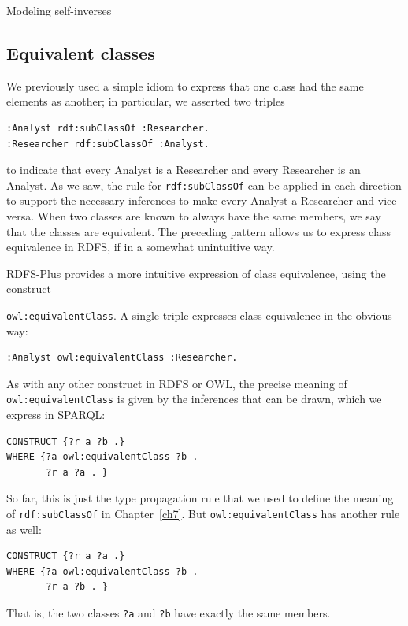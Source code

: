 \begin{challenge}{Modeling self-inverses}
\subsection{Equivalent classes}

We previously used a simple idiom to express that one class had the same
elements as another; in particular, we asserted two triples

\begin{lstlisting}
:Analyst rdf:subClassOf :Researcher.
:Researcher rdf:subClassOf :Analyst.
\end{lstlisting}

to indicate that every Analyst is a Researcher and every Researcher is
an Analyst. As we saw, the rule for \texttt{rdf:subClassOf} can be applied in
each direction to support the necessary inferences to make every Analyst
a Researcher and vice versa. When two classes are known to always have
the same members, we say that the classes are equivalent. The preceding
pattern allows us to express class equivalence in RDFS, if in a somewhat
unintuitive way.

RDFS-Plus provides a more intuitive expression of class equivalence,
using the construct

\texttt{owl:equivalentClass}. A single triple expresses class equivalence in the
obvious way:

\begin{lstlisting}
:Analyst owl:equivalentClass :Researcher.
\end{lstlisting}

As with any other construct in RDFS or OWL, the precise meaning of
\texttt{owl:equivalentClass} is given by the inferences that can be drawn, which
we express in SPARQL:

\begin{lstlisting}
CONSTRUCT {?r a ?b .}
WHERE {?a owl:equivalentClass ?b .
       ?r a ?a . }
\end{lstlisting}

So far, this is just the type propagation rule that we used to define
the meaning of \texttt{rdf:subClassOf} in Chapter~\ref{ch7}. But \texttt{owl:equivalentClass} has another rule as
well:

\begin{lstlisting}
CONSTRUCT {?r a ?a .}
WHERE {?a owl:equivalentClass ?b .
       ?r a ?b . }
\end{lstlisting}

That is, the two classes \texttt{?a} and \texttt{?b} have exactly the same members.


\end{challenge}
